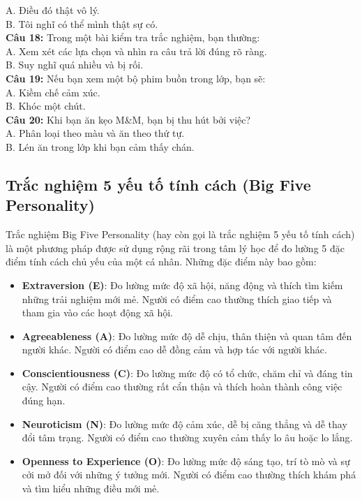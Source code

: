 \begin{multicols}{2}
A. Điều đó thật vô lý. \\
B. Tôi nghĩ có thể mình thật sự có. \\
\textbf{Câu 18:} Trong một bài kiểm tra trắc nghiệm, bạn thường: \\
A. Xem xét các lựa chọn và nhìn ra câu trả lời đúng rõ ràng. \\
B. Suy nghĩ quá nhiều và bị rối. \\
\textbf{Câu 19:} Nếu bạn xem một bộ phim buồn trong lớp, bạn sẽ: \\
A. Kiềm chế cảm xúc. \\
B. Khóc một chút. \\
\textbf{Câu 20:} Khi bạn ăn kẹo M\&M, bạn bị thu hút bởi việc? \\
A. Phân loại theo màu và ăn theo thứ tự. \\
B. Lén ăn trong lớp khi bạn cảm thấy chán. \\
\end{multicols}

\subsection{Trắc nghiệm 5 yếu tố tính cách (Big Five Personality)}

Trắc nghiệm Big Five Personality (hay còn gọi là trắc nghiệm 5 yếu tố tính cách) là một phương pháp được sử dụng rộng rãi trong tâm lý học để đo lường 5 đặc điểm tính cách chủ yếu của một cá nhân. Những đặc điểm này bao gồm:

\begin{itemize}
    \item \textbf{Extraversion (E)}: Đo lường mức độ xã hội, năng động và thích tìm kiếm những trải nghiệm mới mẻ. Người có điểm cao thường thích giao tiếp và tham gia vào các hoạt động xã hội.
    \item \textbf{Agreeableness (A)}: Đo lường mức độ dễ chịu, thân thiện và quan tâm đến người khác. Người có điểm cao dễ đồng cảm và hợp tác với người khác.
    \item \textbf{Conscientiousness (C)}: Đo lường mức độ có tổ chức, chăm chỉ và đáng tin cậy. Người có điểm cao thường rất cẩn thận và thích hoàn thành công việc đúng hạn.
    \item \textbf{Neuroticism (N)}: Đo lường mức độ cảm xúc, dễ bị căng thẳng và dễ thay đổi tâm trạng. Người có điểm cao thường xuyên cảm thấy lo âu hoặc lo lắng.
    \item \textbf{Openness to Experience (O)}: Đo lường mức độ sáng tạo, trí tò mò và sự cởi mở đối với những ý tưởng mới. Người có điểm cao thường thích khám phá và tìm hiểu những điều mới mẻ.
\end{itemize}

